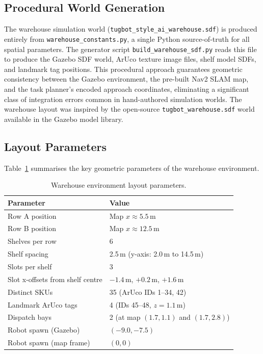 \documentclass[12pt,a4paper]{report}
\begin{document}
\subsection{Procedural World Generation}

The warehouse simulation world (\texttt{tugbot\_style\_ai\_warehouse.sdf}) is produced entirely from \texttt{warehouse\_constants.py}, a single Python source-of-truth for all spatial parameters. The generator script \texttt{build\_warehouse\_sdf.py} reads this file to produce the Gazebo SDF world, ArUco texture image files, shelf model SDFs, and landmark tag positions. This procedural approach guarantees geometric consistency between the Gazebo environment, the pre-built Nav2 SLAM map, and the task planner's encoded approach coordinates, eliminating a significant class of integration errors common in hand-authored simulation worlds. The warehouse layout was inspired by the open-source \texttt{tugbot\_warehouse.sdf} world available in the Gazebo model library.

\subsection{Layout Parameters}

Table~\ref{tab:warehouse} summarises the key geometric parameters of the warehouse environment.

\begin{table}[H]
\centering
\caption{Warehouse environment layout parameters.}
\label{tab:warehouse}
\begin{tabular}{ll}
\toprule
\textbf{Parameter} & \textbf{Value} \\
\midrule
Row A position & Map $x \approx 5.5$\,m \\
Row B position & Map $x \approx 12.5$\,m \\
Shelves per row & 6 \\
Shelf spacing & 2.5\,m (y-axis: 2.0\,m to 14.5\,m) \\
Slots per shelf & 3 \\
Slot x-offsets from shelf centre & $-1.4$\,m, $+0.2$\,m, $+1.6$\,m \\
Distinct SKUs & 35 (ArUco IDs 1–34, 42) \\
Landmark ArUco tags & 4 (IDs 45–48, $z = 1.1$\,m) \\
Dispatch bays & 2 (at map $(1.7, 1.1)$ and $(1.7, 2.8)$) \\
Robot spawn (Gazebo) & $(-9.0, -7.5)$ \\
Robot spawn (map frame) & $(0, 0)$ \\
\bottomrule
\end{tabular}
\end{table}
\end{document}
